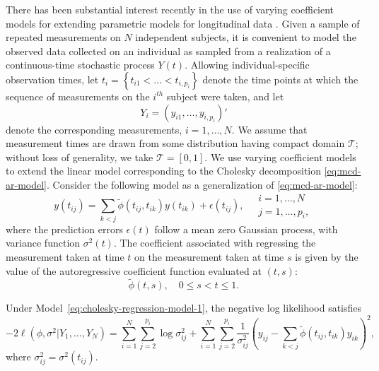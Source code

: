 There has been substantial interest recently in the use of varying coefficient models for extending parametric models for longitudinal data \citep{noh2010sparse,csenturk2013modeling,csenturk2008generalized,chiang2001smoothing,hoover1998nonparametric,fan1999statistical}. Given a sample of repeated measurements on $N$ independent subjects, it is convenient to model the observed data collected on an individual as sampled from a realization of a continuous-time stochastic process $Y\left(t\right)$. Allowing individual-specific observation times, let $t_{i} = \left\{t_{i1} <  \dots < t_{i,p_i}\right\}$ denote the time points at which the sequence of measurements on the $i^{th}$ subject were taken, and let
\[
Y_i = \left(y_{i1}, \dots, y_{i,p_i}\right)'
\]
\noindent
denote the corresponding measurements, $i = 1, \dots, N$. We assume that measurement times are drawn from some distribution having compact domain $\mathcal{T}$; without loss of generality, we take $\mathcal{T} = \left[0,1\right]$. We use varying coefficient models to extend the linear model corresponding to the Cholesky decomposition \eqref{eq:mcd-ar-model}. Consider the following model as a generalization of \eqref{eq:mcd-ar-model}: 
\begin{equation}  \label{eq:cholesky-regression-model-1} 
y\left(t_{ij} \right)  = \sum_{k < j} \tilde{\phi}\left(t_{ij} ,t_{ik}\right) y\left(t_{ik}\right) + \epsilon\left({t_{ij}}\right), \quad \begin{array}{l} i = 1, \dots, N\\ j = 1, \dots, p_i,\end{array}
\end{equation}
\noindent
where the prediction errors $\epsilon\left(t\right)$ follow a mean zero Gaussian process, with variance function $\sigma^2\left(t\right)$. The coefficient associated with regressing the measurement taken at time $t$ on the measurement taken at time $s$ is given by the value of the autoregressive coefficient function evaluated at $\left(t,s\right)$:
\[
\tilde{\phi}\left(t,s\right), \quad 0 \le s < t \le 1.
\]

Under Model~\eqref{eq:cholesky-regression-model-1}, the negative log likelihood satisfies 
\begin{equation} \label{eq:full-joint-likelihood}
-2\ell\left(\phi, \sigma^2 \vert Y_1,\dots, Y_N \right) = \sum_{i=1}^N \sum_{j=2}^{p_i} \log \sigma_{ij}^2+  \sum_{i=1}^N \sum_{j=2}^{p_i} \frac{1}{\sigma^{2}_{ij}}\left( y_{ij} - \sum_{k<j} \tilde{\phi}\left(t_{ij}, t_{ik}\right) y_{ik}  \right)^2,
\end{equation}
\noindent
where $\sigma_{ij}^2 = \sigma^2\left(t_{ij}\right)$.
\bigskip

